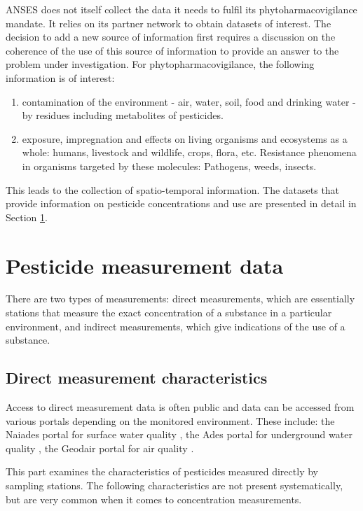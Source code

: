 ANSES does not itself collect the data it needs to fulfil its phytoharmacovigilance mandate. It relies on its partner network to obtain datasets of interest. The decision to add a new source of information first requires a discussion on the coherence of the use of this source of information to provide an answer to the problem under investigation. For phytopharmacovigilance, the following information is of interest: 
\begin{enumerate}
\item contamination of the environment - air, water, soil, food and drinking water - by residues including metabolites of pesticides.
\item exposure, impregnation and effects on living organisms and ecosystems as a whole: humans, livestock and wildlife, crops, flora, etc. Resistance phenomena in organisms targeted by these molecules: Pathogens, weeds, insects.
\end{enumerate}
This leads to the collection of spatio-temporal information. The datasets that provide information on pesticide concentrations and use are presented in detail in Section \ref{chp:2:3}.

\section{Pesticide measurement data}\label{chp:2:3}

There are two types of measurements: direct measurements, which are essentially stations that measure the exact concentration of a substance in a particular environment, and indirect measurements, which give indications of the use of a substance.

\subsection{Direct measurement characteristics}

Access to direct measurement data is often public and data can be accessed from various portals depending on the monitored environment. These include: the Naiades portal for surface water quality \citep{Naiade2}, the Ades portal for underground water quality \citep{Ades}, the Geodair portal for air quality \citep{Geodair}.
 
This part examines the characteristics of pesticides measured directly by sampling stations. The following characteristics are not present systematically, but are very common when it comes to concentration measurements.

